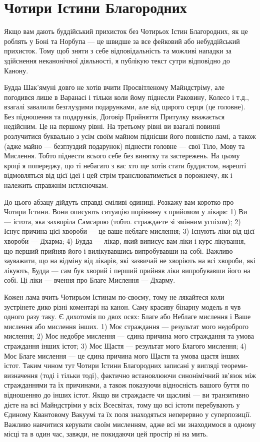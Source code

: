 \section{Чотири Істини Благородних}

Якщо вам дають буддійський прихисток без Чотирьох Істин Благородних,
як це роблять у Боні та Норбупа — це швидше за все фейковий або
небуддійський прихисток. Тому щоб зняти з себе відповідальність
та можливі нападки за здійснення неканонічної діяльності,
я публікую текст сутри відповідно до Канону.

Будда Шак'ямуні довго не хотів вчити Просвітленому Майндстріму,
але погодився лише в Варанасі і тільки коли йому піднесли Раковину,
Колесо і т.д., взагалі завалили безглуздими подарунками,
але від щирого серця (це головне). Без підношення та подарунків,
Договір Прийняття Притулку вважається недійсним. Це на
першому рівні. На третьому рівні ви взагалі повинні розлучитися
буквально з усім своїм майном піднісши його повністю ламі,
а також (адже майно --- безглуздий подарунок) піднести
головне --- свої Тіло, Мову та Мислення. Тобто піднести всього
себе без винятку та застережень. На цьому кроці я попереджу, що
ті небагато з вас хто ще хотів стати буддистом, нарешті відмовляться
від цієї ідеї і цей стрім транслюватиметься в порожнечу, як і
належить справжнім нєтлєночкам.

До цього абзацу дійдуть справді сміливі одиниці. Розкажу вам
коротко про Чотири Істини. Вони описують ситуацію порівняну
з прийомом у лікаря: 1) Ви --- істота, яка захворіла Самсарою (тобто.
страждаєте зі змінним успіхом); 2) Існує причина цієї
хвороби --- це ваше неблаге мислення; 3) Існують ліки
від цієї хвороби --- Дхарма; 4) Будда --- лікар, який виписує
вам ліки і курс лікування, що перший прийняв його і вилікувавшись
випробувавши на собі. Важливо зауважити, що на відміну від лікарів,
які зазвичай не хворіють на всі хвороби, які лікують,
Будда --- сам був хворий і перший прийняв ліки випробувавши
його на собі. Ці ліки — вчення про Благе Мислення --- Дхарму.

Кожен лама вчить Чотирьом Істинам по-своєму, тому не лякайтеся
коли зустрінете дико різні коментарі на канон. Саму
красиву бінарну модель я чув одного разу таку. Є дихотомія
по двох осях: Благе або Неблаге мислення і Ваше мислення або
мислення інших. 1) Моє страждання --- результат мого недоброго
мислення; 2) Моє недобре мислення --- єдина причина
мого страждання та умова страждання інших істот; 3)
Моє Щастя --- результат мого Благого мислення; 4) Моє
Благе мислення --- це єдина причина мого Щастя
та умова щастя інших істот. Таким чином тут
Чотири Істини Благородних записані у вигляді теореми-визначення
(тоді і тільки тоді), фактично встановлюючи синонімічний
зв'язок між стражданнями та їх причинами, а також показуючи
відносність вашого буття по відношенню до інших істот.
Якщо ви страждаєте чи щасливі --- ви транзитивно дієте
на всі Майндстріми у всіх Всесвітах, тому що всі істоти
перебувають у Єдиному Квантовому Вакуумі та їх поля знаходяться
неперервно у суперпозиції. Важливо навчитися керувати
своїм мисленням, адже всі ми знаходимося в одному місці та в один
час, завжди, не покидаючи цей простір ні на мить.

